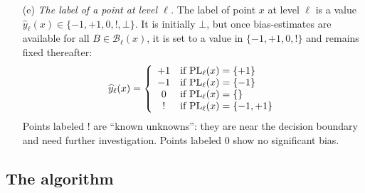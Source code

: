 \documentclass{article}
\def\B{{\mathcal B}}
\def\yh{{\widehat{y}}}
\def\PL{{\rm PL}}
\begin{document}
\begin{enumerate}
\begin{enumerate}
\item[(e)] {\it The label of a point at level $\ell$.} The label of point $x$ at level $\ell$ is a value $\yh_\ell(x) \in \{-1,+1,0,!,\bot\}$. It is initially $\bot$, but once bias-estimates are available for all $B \in \B_\ell(x)$, it is set to a value in $\{-1,+1,0,!\}$ and remains fixed thereafter:
\begin{equation}
\yh_\ell(x) = 
\left\{
\begin{array}{cl}
+1 & \mbox{if $\PL_\ell(x) = \{+1\}$} \\
-1 &  \mbox{if $\PL_\ell(x) = \{-1\}$} \\
0 & \mbox{if $\PL_\ell(x) = \{\}$} \\
! & \mbox{if $\PL_\ell(x) = \{-1,+1\}$}
\end{array}
\right.
\label{eq:provisional-label}
\end{equation}
Points labeled $!$ are ``known unknowns'': they are near the decision boundary and need further investigation. Points labeled $0$ show no significant bias.

\end{enumerate}

\end{enumerate}

\subsection{The algorithm}
\end{document}
